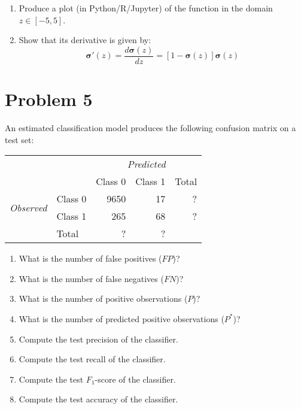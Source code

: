 \documentclass[11pt,twoside]{article}
\newcommand{\pts}[1]{\marginpar{ \small\hspace{0pt} \textit{[#1]} } }
\newcommand{\?}{\stackrel{?}{=}}
\newcommand{\fr}{\frac}
\begin{document}
\begin{enumerate}[\bf(a)]
\item Produce a plot (in Python/R/Jupyter) of\pts{2} the function in the domain $z \in [-5,5]$.
\item Show that its derivative is given by: \pts{4}
  \begin{equation}
    \bm\sigma'(z)  = \fr{d\bm\sigma(z)}{dz} = [1 - \bm\sigma(z)]\bm\sigma(z)
  \end{equation}
\end{enumerate}

\eject
 \section*{Problem 5 }
An estimated classification model produces the following confusion matrix on a test set:

\begin{table}[h!]
  \centering \small
  \begin{tabular}{l l r r r}\toprule
    && \multicolumn{3}{c}{\it Predicted} \\
                                       &             & Class 0  & Class 1 & Total \\\midrule
    \multirow{2}{*}{\it Observed}& Class 0 & 9650 & 17 & ? \\
                                       & Class 1 &  265 & 68 & ? \\\midrule
    & Total & ? & ? & \\\bottomrule
  \end{tabular}
\end{table}
  
\begin{enumerate}[\bf (a)]

\item What is \pts{1} the number of false positives ($FP$)?

\item What is \pts{1} the number of false negatives ($FN$)?

\item What is \pts{1} the number of positive observations ($P$)?
  
\item What is \pts{1} the number of predicted positive  observations ($P^{*}$)?
  
\item Compute the test precision of the classifier. \pts{2} 
  
\item Compute the test recall of the classifier. \pts{2} 

\item Compute the test $F_1$-score of the classifier. \pts{2} 
\item Compute the test \pts{2}  accuracy of the classifier.
  
\end{enumerate}
\end{document}
